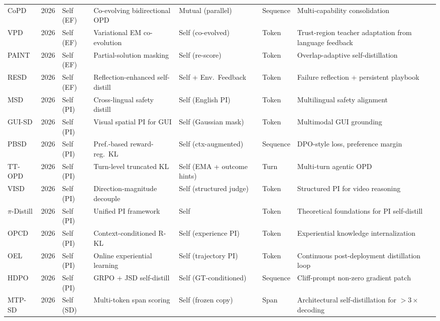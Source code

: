 \documentclass{article} %
\begin{document}
\begin{table}[t]
{\begin{tabular}{@{}lclllll@{}}
        CoPD \citep{2604.27083} & 2026 & Self (EF) & Co-evolving bidirectional OPD & Mutual (parallel) & Sequence & Multi-capability consolidation \\
        VPD \citep{2605.15113} & 2026 & Self (EF) & Variational EM co-evolution & Self (co-evolved) & Token & Trust-region teacher adaptation from language feedback \\
        PAINT \citep{2604.26573} & 2026 & Self (EF) & Partial-solution masking & Self (re-score) & Token & Overlap-adaptive self-distillation \\
        RESD \citep{2605.12741} & 2026 & Self (EF) & Reflection-enhanced self-distill & Self + Env.~Feedback & Token & Failure reflection + persistent playbook \\
        MSD \citep{2605.02971} & 2026 & Self (PI) & Cross-lingual safety distill & Self (English PI) & Token & Multilingual safety alignment \\
        GUI-SD \citep{2605.00642} & 2026 & Self (PI) & Visual spatial PI for GUI & Self (Gaussian mask) & Token & Multimodal GUI grounding \\
        PBSD \citep{2605.05040} & 2026 & Self (PI) & Pref.-based reward-reg.\ KL & Self (ctx-augmented) & Sequence & DPO-style loss, preference margin \\
        TT-OPD \citep{2605.02943} & 2026 & Self (PI) & Turn-level truncated KL & Self (EMA + outcome hints) & Turn & Multi-turn agentic OPD \\
        VISD \citep{2605.06094} & 2026 & Self (PI) & Direction-magnitude decouple & Self (structured judge) & Token & Structured PI for video reasoning \\
        $\pi$-Distill \citep{2602.04942} & 2026 & Self (PI) & Unified PI framework & Self & Token & Theoretical foundations for PI self-distill \\
        OPCD \citep{2602.12275} & 2026 & Self (PI) & Context-conditioned R-KL & Self (experience PI) & Token & Experiential knowledge internalization \\
        OEL \citep{2603.16856} & 2026 & Self (PI) & Online experiential learning & Self (trajectory PI) & Token & Continuous post-deployment distillation loop \\
        HDPO \citep{2603.23871} & 2026 & Self (PI) & GRPO + JSD self-distill & Self (GT-conditioned) & Sequence & Cliff-prompt non-zero gradient patch \\
        MTP-SD \citep{2602.06019} & 2026 & Self (SD) & Multi-token span scoring & Self (frozen copy) & Span & Architectural self-distillation for $>3\times$ decoding \\

\end{tabular}}
\end{table}
\end{document}
